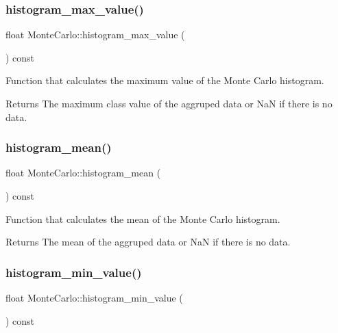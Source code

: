 \subsubsection{\texorpdfstring{histogram\+\_\+max\+\_\+value()}{histogram\_max\_value()}}
{\footnotesize\ttfamily float Monte\+Carlo\+::histogram\+\_\+max\+\_\+value (\begin{DoxyParamCaption}{ }\end{DoxyParamCaption}) const}

Function that calculates the maximum value of the Monte Carlo histogram. \begin{DoxyReturn}{Returns}
The maximum class value of the aggruped data or NaN if there is no data. 
\end{DoxyReturn}
\mbox{\label{classMonteCarlo_a59eb4eacad6a3e88b2ee2cd21cb177cd}} 
\subsubsection{\texorpdfstring{histogram\+\_\+mean()}{histogram\_mean()}}
{\footnotesize\ttfamily float Monte\+Carlo\+::histogram\+\_\+mean (\begin{DoxyParamCaption}{ }\end{DoxyParamCaption}) const}

Function that calculates the mean of the Monte Carlo histogram. \begin{DoxyReturn}{Returns}
The mean of the aggruped data or NaN if there is no data. 
\end{DoxyReturn}
\mbox{\label{classMonteCarlo_a1280523b7ca7463dcd16c23a8f8a5439}} 
\subsubsection{\texorpdfstring{histogram\+\_\+min\+\_\+value()}{histogram\_min\_value()}}
{\footnotesize\ttfamily float Monte\+Carlo\+::histogram\+\_\+min\+\_\+value (\begin{DoxyParamCaption}{ }\end{DoxyParamCaption}) const}


